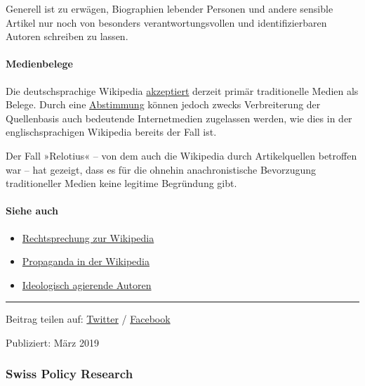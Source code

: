 Generell ist zu erwägen, Biographien lebender Personen und andere
sensible Artikel nur noch von besonders verantwortungsvollen und
identifizierbaren Autoren schreiben zu lassen.

\hypertarget{medienbelege}{%
\paragraph{Medienbelege}\label{medienbelege}}

Die deutschsprachige Wikipedia
\href{https://de.wikipedia.org/wiki/Wikipedia:Belege}{akzeptiert}
derzeit primär traditionelle Medien als Belege. Durch eine
\href{https://de.wikipedia.org/wiki/Wikipedia:Meinungsbilder}{Abstimmung}
können jedoch zwecks Verbreiterung der Quellenbasis auch bedeutende
Internet­medien zugelassen werden, wie dies in der englischsprachigen
Wikipedia bereits der Fall ist.

Der Fall »Relotius« -- von dem auch die Wikipedia durch Artikelquellen
betroffen war -- hat gezeigt, dass es für die ohnehin anachronistische
Bevorzugung traditioneller Medien keine legitime Begründung gibt.

\hypertarget{siehe-auch}{%
\paragraph{Siehe auch}\label{siehe-auch}}

\begin{itemize}
\tightlist
\item
  \href{https://de.wikipedia.org/wiki/Wikipedia:Rechtsprechung_zur_Wikipedia}{Rechtsprechung
  zur Wikipedia}
\item
  \href{https://swprs.org/propaganda-in-der-wikipedia/}{Propaganda in
  der Wikipedia}
\item
  \href{https://swprs.org/wikipedia-manipulation-autoren/}{Ideologisch
  agierende Autoren}
\end{itemize}

\begin{center}\rule{0.5\linewidth}{\linethickness}\end{center}

Beitrag teilen auf:
\href{https://twitter.com/intent/tweet?url=https://swprs.org/wikipedia-missbrauch-massnahmen/}{Twitter}
/
\href{https://www.facebook.com/share.php?u=https://swprs.org/wikipedia-missbrauch-massnahmen/}{Facebook}

Publiziert: März 2019

\hypertarget{swiss-policy-research}{%
\subsubsection{Swiss Policy Research}\label{swiss-policy-research}}

